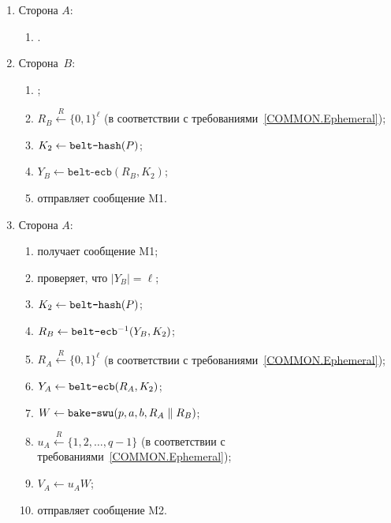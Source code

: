 \begin{enumerate}
\item
Сторона $A$:
\begin{enumerate}
\item
{}.
\end{enumerate}

\item
Сторона~$B$:
\begin{enumerate}
\item
{};
\item
$R_B\stackrel{R}{\leftarrow}\{0,1\}^\ell$ 
(в соответствии с требованиями~\ref{COMMON.Ephemeral});
\item
$K_2\leftarrow\texttt{belt-hash}(P)$;
\item
$Y_B\leftarrow \texttt{belt-ecb}(R_B,K_2)$;
\item
отправляет сообщение M1.
\end{enumerate}

\item
Сторона $A$:
\begin{enumerate}
\item
получает сообщение M1;
\item
проверяет, что $|Y_B|=\ell$;
\item
$K_2\leftarrow\texttt{belt-hash}(P)$;
\item
$R_B\leftarrow \texttt{belt-ecb}^{-1}(Y_B,K_2)$;
\item
$R_A\stackrel{R}{\leftarrow}\{0,1\}^\ell$
(в соответствии с требованиями~\ref{COMMON.Ephemeral});
\item
$Y_A\leftarrow\texttt{belt-ecb}(R_A,K_2)$;
\item
$W\leftarrow\texttt{bake-swu}(p,a,b,R_A\parallel R_B)$;
\item
$u_A\stackrel{R}{\leftarrow}\{1,2,\ldots,q-1\}$
(в соответствии с требованиями~\ref{COMMON.Ephemeral});
\item
$V_A\leftarrow u_A W$;
\item
отправляет сообщение M2.
\end{enumerate}


\end{enumerate}
